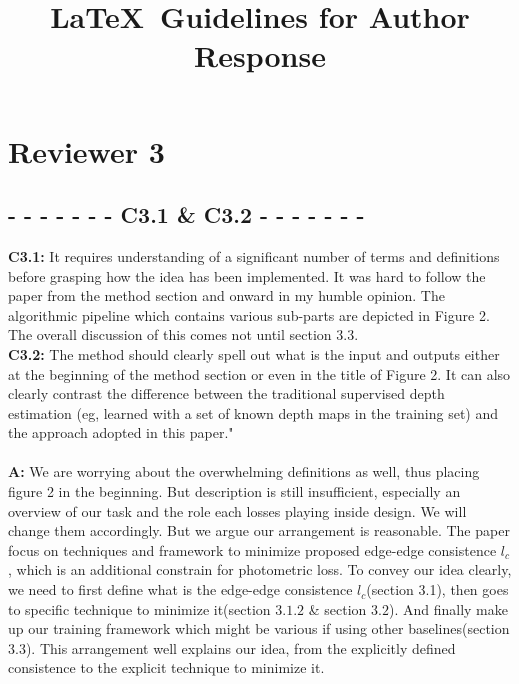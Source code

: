 \documentclass[10pt,twocolumn,letterpaper]{article}
\begin{document}
\title{\LaTeX\ Guidelines for Author Response}  %

\maketitle
\thispagestyle{empty}


\section*{Reviewer 3}
\subsection* {- - - - - - - C3.1 \& C3.2 - - - - - - -}
\noindent \textbf{C3.1:} It requires understanding of a significant number of terms and definitions before grasping how the idea has been implemented. It was hard to follow the paper from the method section and onward in my humble opinion. The algorithmic pipeline which contains various sub-parts are depicted in Figure 2. The overall discussion of this comes not until section 3.3. \\
\textbf{C3.2:} The method should clearly spell out what is the input and outputs either at the beginning of the method section or even in the title of Figure 2. It can also clearly contrast the difference between the traditional supervised depth estimation (eg, learned with a set of known depth maps in the training set) and the approach adopted in this paper."\\ \\
\noindent \textbf{A:} We are worrying about the overwhelming definitions as well, thus placing figure 2 in the beginning. But description is still insufficient, especially an overview of our task and the role each losses playing inside design. We will change them accordingly. But we argue our arrangement is reasonable. The paper focus on techniques and framework to minimize proposed edge-edge consistence $l_c$, which is an additional constrain for photometric loss. To convey our idea clearly, we need to first define what is the edge-edge consistence $l_c$(section 3.1), then goes to specific technique to minimize it(section $3.1.2$ \& section $3.2$). And finally make up our training framework which might be various if using other baselines(section 3.3). This arrangement well explains our idea, from the explicitly defined consistence to the explicit technique to minimize it.
\end{document}

